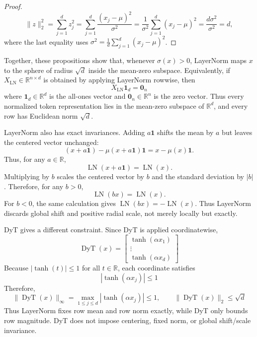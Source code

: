 \documentclass[11pt]{article}
\newcommand{\R}{\mathbb{R}}
\newcommand{\one}{\mathbf{1}}
\newcommand{\LN}{\operatorname{LN}}
\newcommand{\DyT}{\operatorname{DyT}}
\begin{document}
\begin{proof}
\[
    \|z\|_2^2
    =
    \sum_{j=1}^d z_j^2
    =
    \sum_{j=1}^d \frac{(x_j-\mu)^2}{\sigma^2}
    =
    \frac{1}{\sigma^2}\sum_{j=1}^d (x_j-\mu)^2
    =
    \frac{d\sigma^2}{\sigma^2}
    =
    d,
\]
where the last equality uses \(\sigma^2 = \frac{1}{d}\sum_{j=1}^d(x_j-\mu)^2\).
\end{proof}
Together, these propositions show that, whenever \(\sigma(x)>0\), LayerNorm maps \(x\) to the sphere of radius \(\sqrt d\) inside the mean-zero subspace. Equivalently, if \(X_{\LN}\in\mathbb R^{n\times d}\) is obtained by applying LayerNorm rowwise, then
\begin{equation}
    X_{\LN}\one_d=\mathbf 0_n
\label{eq:ln-mean-zero-matrix}
\end{equation}
where \(\one_d\in\mathbb R^d\) is the all-ones vector and \(\mathbf 0_n\in\mathbb R^n\) is the zero vector. Thus every normalized token representation lies in the mean-zero subspace of \(\mathbb R^d\), and every row has Euclidean norm \(\sqrt d\).

LayerNorm also has exact invariances. Adding \(a\one\) shifts the mean by \(a\) but leaves the centered vector unchanged:
\[
    (x+a\one)-\mu(x+a\one)\one
    =
    x-\mu(x)\one.
\]
Thus, for any \(a\in\R\),
\begin{equation}
    \LN(x+a\one)=\LN(x).
\label{eq:ln-shift-invariance}
\end{equation}
Multiplying by \(b\) scales the centered vector by \(b\) and the standard deviation by \(|b|\). Therefore, for any \(b>0\),
\begin{equation}
    \LN(bx)=\LN(x).
\label{eq:ln-scale-invariance}
\end{equation}
For \(b<0\), the same calculation gives \(\LN(bx)=-\LN(x)\). Thus LayerNorm discards global shift and positive radial scale, not merely locally but exactly.

DyT gives a different constraint. Since DyT is applied coordinatewise,
\[
    \DyT(x)
    =
    \begin{bmatrix}
        \tanh(\alpha x_1)\\
        \vdots\\
        \tanh(\alpha x_d)
    \end{bmatrix}
\]
Because \(|\tanh(t)|\leq 1\) for all \(t\in\mathbb R\), each coordinate satisfies
\[
    |\tanh(\alpha x_j)|\leq 1
\]
Therefore,
\begin{equation}
    \|\DyT(x)\|_\infty
    =
    \max_{1\leq j\leq d}|\tanh(\alpha x_j)|
    \leq 1,
    \qquad
    \|\DyT(x)\|_2\leq \sqrt d
\label{eq:dyt-row-bounds}
\end{equation}
Thus LayerNorm fixes row mean and row norm exactly, while DyT only bounds row magnitude. DyT does not impose centering, fixed norm, or global shift/scale invariance.
\end{document}
